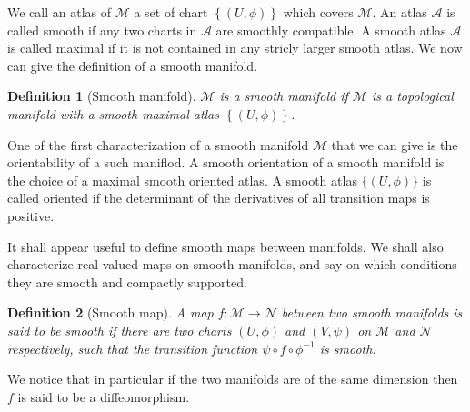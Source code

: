 \documentclass[10pt]{book}
\newcommand{\Acal}{\mathcal{A}}
\newcommand{\Mcal}{\mathcal{M}}
\newcommand{\Ncal}{\mathcal{N}}
\theoremstyle{break}
\newtheorem{definition}{Definition}
\begin{document}
\bigskip


We call an atlas of $\Mcal$ a set of chart $\left\{ (U, \phi) \right\}$ which covers $\Mcal$. An atlas $\Acal$ is called smooth if any two charts in $\Acal$ are smoothly compatible. A smooth atlas $\Acal$ is called maximal if it is not contained in any stricly larger smooth atlas. We now can give the definition of a smooth manifold.


\begin{definition}[Smooth manifold]
$\Mcal$ is a smooth manifold if $\Mcal$ is a topological manifold with a smooth maximal atlas $\left\{(U,\phi)\right\}$.
\end{definition}


One of the first characterization of a smooth manifold $\Mcal$ that we can give is the orientability of a such maniflod. A smooth orientation of a smooth manifold is the choice of a maximal smooth oriented atlas. A smooth atlas $\{(U,\phi)\}$ is called oriented if the determinant of the derivatives of all transition maps is positive. 


\bigskip


It shall appear useful to define smooth maps between manifolds. We shall also characterize real valued maps on smooth manifolds, and say on which conditions they are smooth and compactly supported.



\begin{definition}[Smooth map]
A map $f : \Mcal \to \Ncal$ between two smooth manifolds is said to be smooth if there are two charts $(U,\phi)$ and $(V,\psi)$ on $\Mcal$ and $\Ncal$ respectively, such that the transition function $\psi \circ f \circ \phi^{-1}$ is  smooth.
\end{definition}

We notice that in particular if the two manifolds are of the same dimension then $f$ is said to be a diffeomorphism.
\end{document}

